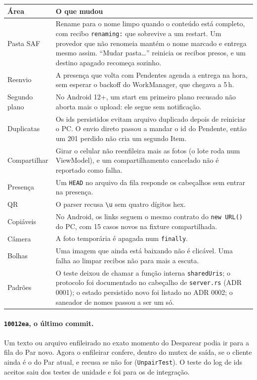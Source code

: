 \documentclass[11pt,a4paper]{article}
\begin{document}
\begin{tabularx}{\linewidth}{@{}>{\raggedright}p{3.2cm}X@{}}
\toprule
Área & O que mudou \\
\midrule
Pasta SAF & Rename para o nome limpo quando o conteúdo está completo, com recibo \texttt{renaming:} que sobrevive a um restart. Um provedor que não renomeia mantém o nome marcado e entrega mesmo assim. ``Mudar pasta\dots'' reinicia os recibos presos, e um destino apagado recomeça sozinho. \\
Reenvio & A presença que volta com Pendentes agenda a entrega na hora, sem esperar o backoff do WorkManager, que chegava a 5\,h. \\
Segundo plano & No Android 12+, um start em primeiro plano recusado não aborta mais o upload: ele segue sem notificação. \\
Duplicatas & Os ids persistidos evitam arquivo duplicado depois de reiniciar o PC. O envio direto passou a mandar o id do Pendente, então um 201 perdido não cria um segundo Item. \\
Compartilhar & Girar o celular não reenfileira mais as fotos (o lote roda num ViewModel), e um compartilhamento cancelado não é reportado como falha. \\
Presença & Um \texttt{HEAD} no arquivo da fila responde os cabeçalhos sem entrar na presença. \\
QR & O parser recusa \texttt{\textbackslash u} sem quatro dígitos hex. \\
Copiáveis & No Android, os links seguem o mesmo contrato do \texttt{new URL()} do PC, com 15 casos novos na fixture compartilhada. \\
Câmera & A foto temporária é apagada num \texttt{finally}. \\
Bolhas & Uma imagem que ainda está baixando não é clicável. Uma falha ao limpar recibos não para mais a escuta. \\
Padrões & O teste deixou de chamar a função interna \texttt{sharedUris}; o protocolo foi documentado no cabeçalho de \texttt{server.rs} (ADR 0001); o estado persistido novo foi listado no ADR 0002; o saneador de nomes passou a ser um só. \\
\bottomrule
\end{tabularx}

\paragraph{\texttt{10012ea}, o último commit.} Um texto ou arquivo enfileirado
no exato momento do Desparear podia ir para a fila do Par novo. Agora o
enfileirar confere, dentro do mutex de saída, se o cliente ainda é o do Par
atual, e recusa se não for (\texttt{UnpairTest}). O teste do log de ids
aceitos saiu dos testes de unidade e foi para os de integração.
\end{document}

